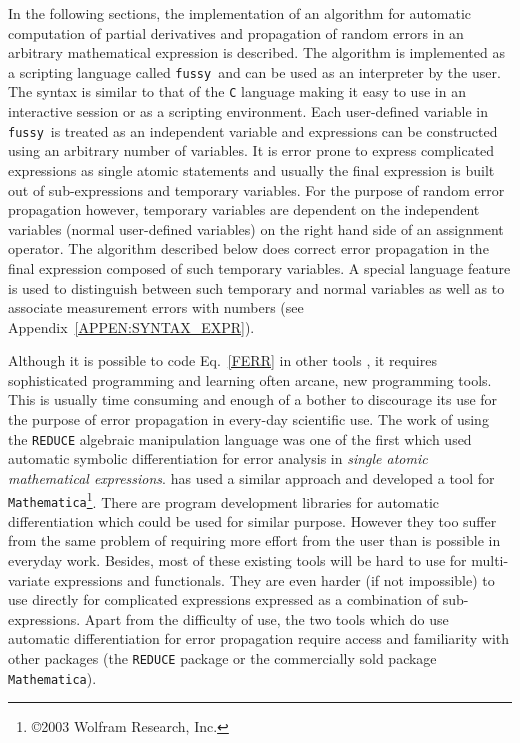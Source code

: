 \documentclass[12pt]{article}
\newcommand{\Fussy}{{\tt fussy}}
\begin{document}
In the following sections, the implementation of an algorithm for
automatic computation of partial derivatives and propagation of random
errors in an arbitrary mathematical expression is described.  The
algorithm is implemented as a scripting language called \Fussy\ and
can be used as an interpreter by the user.  The syntax is similar to
that of the {\tt C} language making it easy to use in an interactive
session or as a scripting environment.  Each user-defined variable in
\Fussy\ is treated as an independent variable and expressions can be
constructed using an arbitrary number of variables.  It is error prone
to express complicated expressions as single atomic statements and
usually the final expression is built out of sub-expressions and
temporary variables.  For the purpose of random error propagation
however, temporary variables are dependent on the independent
variables (normal user-defined variables) on the right hand side of an
assignment operator.  The algorithm described below does correct error
propagation in the final expression composed of such temporary
variables.  A special language feature is used to distinguish between
such temporary and normal variables as well as to associate
measurement errors with numbers (see
Appendix~\ref{APPEN:SYNTAX_EXPR}).

Although it is possible to code Eq.~\ref{FERR} in other tools
\citep{Calc,EDA,Bischof1997A-A}, it requires sophisticated programming
and learning often arcane, new programming tools.  This is usually time
consuming and enough of a bother to discourage its use for the purpose
of error propagation in every-day scientific use.  The work of
\citet{Stoutemyer:1977} using the {\tt REDUCE} algebraic manipulation
language \citep{REDUCE2,REDUCE} was one of the first which used
automatic symbolic differentiation for error analysis in {\it single
  atomic mathematical expressions}.  \citet{EDA} has used a similar
approach and developed a tool for {\tt
  Mathematica}\footnote{\copyright 2003 Wolfram Research, Inc.}.
There are program development libraries
\citep{ScComp,Griewank:1996:AAP,Tsukanov2003Dsa} for automatic
differentiation which could be used for similar purpose.  However they
too suffer from the same problem of requiring more effort from the
user than is possible in everyday work.  Besides, most of these
existing tools will be hard to use for multi-variate expressions and
functionals.  They are even harder (if not impossible) to use directly
for complicated expressions expressed as a combination of
sub-expressions.  Apart from the difficulty of use, the two tools
which do use automatic differentiation for error propagation require
access and familiarity with other packages (the {\tt REDUCE} package
or the commercially sold package {\tt Mathematica}).
\end{document}

